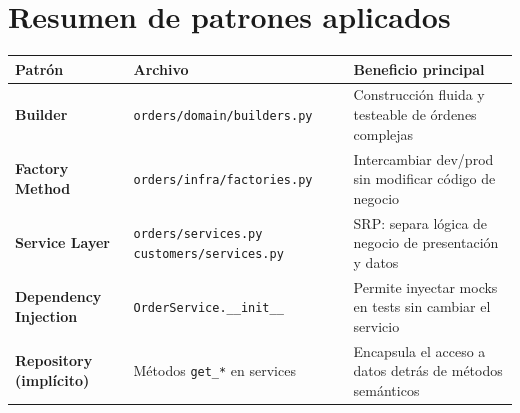 \documentclass[12pt, a4paper]{article}
\begin{document}
\section{Resumen de patrones aplicados}

\begin{center}
\begin{tabular}{@{}p{3.5cm}p{4.5cm}p{5cm}@{}}
    \toprule
    \textbf{Patrón} & \textbf{Archivo} & \textbf{Beneficio principal} \\
    \midrule
    \textbf{Builder} &
    \texttt{orders/domain/builders.py} &
    Construcción fluida y testeable de órdenes complejas \\[0.5em]

    \textbf{Factory Method} &
    \texttt{orders/infra/factories.py} &
    Intercambiar dev/prod sin modificar código de negocio \\[0.5em]

    \textbf{Service Layer} &
    \texttt{orders/services.py} \newline \texttt{customers/services.py} &
    SRP: separa lógica de negocio de presentación y datos \\[0.5em]

    \textbf{Dependency Injection} &
    \texttt{OrderService.\_\_init\_\_} &
    Permite inyectar mocks en tests sin cambiar el servicio \\[0.5em]

    \textbf{Repository (implícito)} &
    Métodos \texttt{get\_*} en services &
    Encapsula el acceso a datos detrás de métodos semánticos \\
    \bottomrule
\end{tabular}
\end{center}

\end{document}
